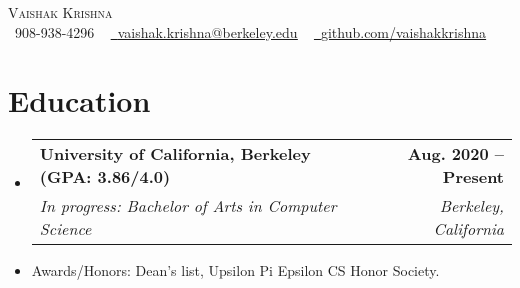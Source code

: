 \documentclass[letterpaper,11pt]{article}
\makeatletter
\newcommand{\resumeSubheading}[4]{
  \vspace{-2pt}\item
    \begin{tabular*}{1.0\textwidth}[t]{l@{\extracolsep{\fill}}r}
      \textbf{#1} & \textbf{\small #2} \\
      \textit{\small#3} & \textit{\small #4} \\
    \end{tabular*}\vspace{-7pt}
}
\newcommand{\resumeSubHeadingListStart}{\begin{itemize}[leftmargin=0.0in, label={}]}
\newcommand{\resumeSubHeadingListEnd}{\end{itemize}}
\makeatother
\begin{document}

\begin{center}
    {\Huge \scshape Vaishak Krishna} \\ \vspace{1pt}
    \small \raisebox{-0.1\height}\faPhone\ 908-938-4296 ~ \href{mailto:vaishak.krishna@berkeley.edu}{\raisebox{-0.2\height}\faEnvelope\  \underline{vaishak.krishna@berkeley.edu}} ~ 
    \href{https://github.com/vaishakkrishna}{\raisebox{-0.2\height}\faGithub\ \underline{github.com/vaishakkrishna}}
    \vspace{-8pt}
\end{center}


\section{Education}
  \resumeSubHeadingListStart
    \resumeSubheading
  {University of California, Berkeley (GPA: 3.86/4.0)}{Aug. 2020 -- Present}
      {In progress: Bachelor of Arts in Computer Science}{Berkeley, California}
    \vspace{-5pt}
      \item{Awards/Honors: Dean's list, Upsilon Pi Epsilon CS Honor Society.}

  \resumeSubHeadingListEnd   
  
\vspace{-10pt}
\end{document}
